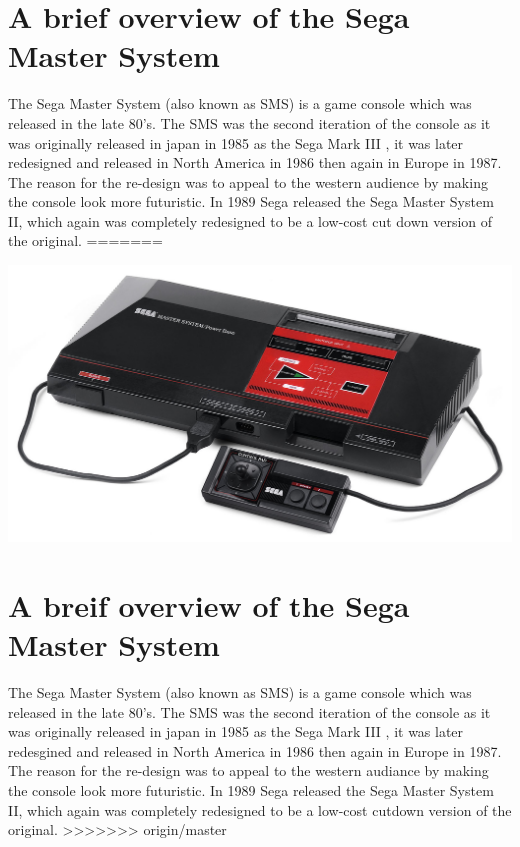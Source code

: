 \documentclass{scrartcl}
\begin{document}
\section{A brief overview of the Sega Master System}

The Sega Master System (also known as SMS) is a game console which was released in the late 80’s. The SMS was the second iteration of the console as it was originally released in japan in 1985 as the Sega Mark III \cite{Weiss2009}, it was later redesigned and released in North America in 1986 then again in Europe in 1987. The reason for the re-design was to appeal to the western audience by making the console look more futuristic\cite{parkin}. In 1989 Sega released the Sega Master System II, which again was completely redesigned to be a low-cost cut down version of the original.
=======

\includegraphics[scale=0.3]{Sega-Master-System.jpg}

\section{A breif overview of the Sega Master System}

The Sega Master System (also known as SMS) is a game console which was released in the late 80’s. The SMS was the second iteration of the console as it was originally released in japan in 1985 as the Sega Mark III \cite{Weiss2009}, it was later redesgined and released in North America in 1986 then again in Europe in 1987. The reason for the re-design was to appeal to the western audiance by making the console look more futuristic\cite{parkin}. In 1989 Sega released the Sega Master System II, which again was completely redesigned to be a low-cost cutdown version of the original.
>>>>>>> origin/master
\end{document}

